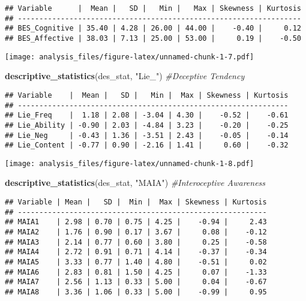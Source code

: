 \documentclass[
]{article}
\newenvironment{Shaded}{\begin{snugshade}}{\end{snugshade}}
\newcommand{\CommentTok}[1]{\textcolor[rgb]{0.56,0.35,0.01}{\textit{#1}}}
\newcommand{\KeywordTok}[1]{\textcolor[rgb]{0.13,0.29,0.53}{\textbf{#1}}}
\newcommand{\NormalTok}[1]{#1}
\newcommand{\StringTok}[1]{\textcolor[rgb]{0.31,0.60,0.02}{#1}}
\begin{document}
\begin{verbatim}
## Variable      |  Mean |   SD |   Min |   Max | Skewness | Kurtosis
## ------------------------------------------------------------------
## BES_Cognitive | 35.40 | 4.28 | 26.00 | 44.00 |    -0.40 |     0.12
## BES_Affective | 38.03 | 7.13 | 25.00 | 53.00 |     0.19 |    -0.50
\end{verbatim}

\texttt{[image: analysis\_files/figure-latex/unnamed-chunk-1-7.pdf]}

\begin{Shaded}
\begin{Highlighting}[]
\KeywordTok{descriptive_statistics}\NormalTok{(des_stat, }\StringTok{"Lie_"}\NormalTok{)          }\CommentTok{#Deceptive Tendency}
\end{Highlighting}
\end{Shaded}

\begin{verbatim}
## Variable    |  Mean |   SD |   Min |  Max | Skewness | Kurtosis
## ---------------------------------------------------------------
## Lie_Freq    |  1.18 | 2.08 | -3.04 | 4.30 |    -0.52 |    -0.61
## Lie_Ability | -0.90 | 2.03 | -4.84 | 3.23 |    -0.20 |    -0.25
## Lie_Neg     | -0.43 | 1.36 | -3.51 | 2.43 |    -0.05 |    -0.14
## Lie_Content | -0.77 | 0.90 | -2.16 | 1.41 |     0.60 |    -0.32
\end{verbatim}

\texttt{[image: analysis\_files/figure-latex/unnamed-chunk-1-8.pdf]}

\begin{Shaded}
\begin{Highlighting}[]
\KeywordTok{descriptive_statistics}\NormalTok{(des_stat, }\StringTok{"MAIA"}\NormalTok{)          }\CommentTok{#Interoceptive Awareness}
\end{Highlighting}
\end{Shaded}

\begin{verbatim}
## Variable | Mean |   SD |  Min |  Max | Skewness | Kurtosis
## ----------------------------------------------------------
## MAIA1    | 2.98 | 0.70 | 0.75 | 4.25 |    -0.94 |     2.43
## MAIA2    | 1.76 | 0.90 | 0.17 | 3.67 |     0.08 |    -0.12
## MAIA3    | 2.14 | 0.77 | 0.60 | 3.80 |     0.25 |    -0.58
## MAIA4    | 2.72 | 0.91 | 0.71 | 4.14 |    -0.37 |    -0.34
## MAIA5    | 3.33 | 0.77 | 1.40 | 4.80 |    -0.51 |     0.02
## MAIA6    | 2.83 | 0.81 | 1.50 | 4.25 |     0.07 |    -1.33
## MAIA7    | 2.56 | 1.13 | 0.33 | 5.00 |     0.04 |    -0.67
## MAIA8    | 3.36 | 1.06 | 0.33 | 5.00 |    -0.99 |     0.95
\end{verbatim}
\end{document}
